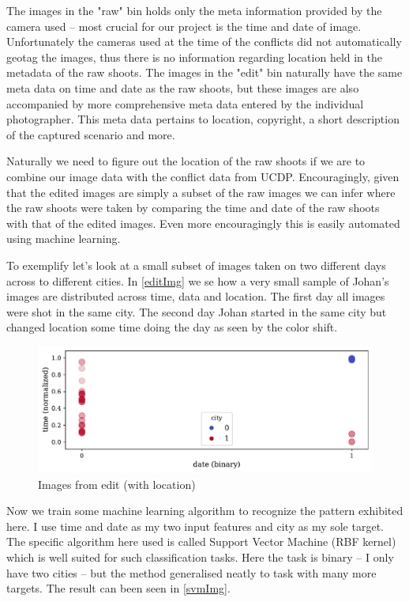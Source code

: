 \documentclass[a4paper]{article}
\begin{document}
The images in the "raw" bin holds only the meta information provided by the camera used -- most crucial for our project is the time and date of image. Unfortunately the cameras used at the time of the conflicts did not automatically geotag the images, thus there is no information regarding location held in the metadata of the raw shoots. The images in the "edit" bin naturally have the same meta data on time and date as the raw shoots, but these images are also accompanied by more comprehensive meta data entered by the individual photographer. This meta data pertains to location, copyright, a short description of the captured scenario and more.\par 

Naturally we need to figure out the location of the raw shoots if we are to combine our image data with the conflict data from UCDP. Encouragingly, given that the edited images are simply a subset of the raw images we can infer where the raw shoots were taken by comparing the time and date of the raw shoots with that of the edited images. Even more encouragingly this is easily automated using machine learning.\par

To exemplify let's look at a small subset of images taken on two different days across to different cities. In \autoref{editImg} we se how a very small sample of Johan's images are distributed across time, data and location. The first day all images were shot in the same city. The second day Johan started in the same city but changed location some time doing the day as seen by the color shift.\par


\begin{figure}[!htb]
	\centering
	\caption{Images from edit (with location)}\label{editImg}
	\includegraphics[scale=0.65]{edit_img.pdf}
\end{figure}

Now we train some machine learning algorithm to recognize the pattern exhibited here. I use time and date as my two input features and city as my sole target. The specific algorithm here used is called Support Vector Machine (RBF kernel) which is well suited for such classification tasks. Here the task is binary -- I only have two cities -- but the method generalised neatly to task with many more targets. The result can been seen in \autoref{svmImg}.\par
 
\end{document}
